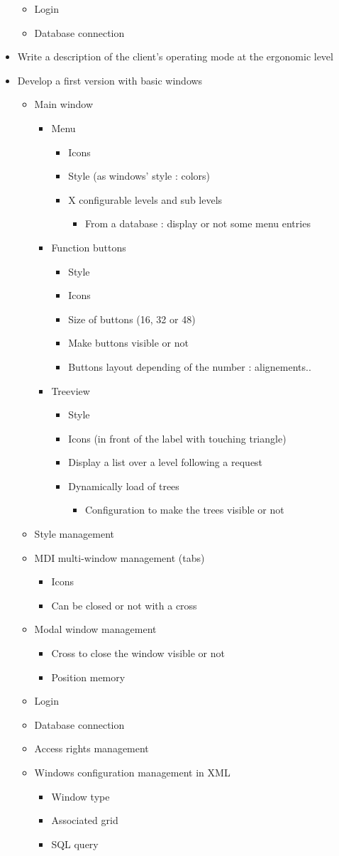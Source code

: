 \documentclass[a4paper, 12pt, french]{article}
\newcommand{\bdot}{\item[\color{ssiYellow}\ding{108}]}
\newcommand{\bdotoutlined}{\item[\color{ssiYellow}\ding{109}]}
\newcommand{\bsquare}{\item[\color{ssiYellow}\ding{110}]}
\newcommand{\bsquareoutlined}{\item[\color{ssiYellow}\ding{111}]}
\newcommand{\bdiamond}{\item[\color{ssiYellow}\ding{117}]}
\begin{document}
\begin{itemize}
\begin{itemize}
\begin{itemize}
									\end{itemize}
								\bdotoutlined{Login}
								\bdotoutlined{Database connection}
							\end{itemize}
						\bdot{Write a description of the client's operating mode at the ergonomic level}
						\bdot{Develop a first version with basic windows}
							\begin{itemize}
								\bdotoutlined{Main window}
									\begin{itemize}
										\bsquare{Menu}
											\begin{itemize}
												\bsquareoutlined{Icons}
												\bsquareoutlined{Style (as windows' style : colors)}
												\bsquareoutlined{X configurable levels and sub levels}
													\begin{itemize}
														\bdiamond{From a database : display or not some menu entries}
													\end{itemize}
											\end{itemize}
										\bsquare{Function buttons}
											\begin{itemize}
												\bsquareoutlined{Style}
												\bsquareoutlined{Icons}
												\bsquareoutlined{Size of buttons (16, 32 or 48)}
												\bsquareoutlined{Make buttons visible or not}
												\bsquareoutlined{Buttons layout depending of the number : alignements..}
											\end{itemize}
										\bsquare{Treeview}
											\begin{itemize}
												\bsquareoutlined{Style}
												\bsquareoutlined{Icons (in front of the label with touching triangle)}
												\bsquareoutlined{Display a list over a level following a request}
												\bsquareoutlined{Dynamically load of trees}
													\begin{itemize}
														\bdiamond{Configuration to make the trees visible or not}
													\end{itemize}
											\end{itemize}
									\end{itemize}
								\bdotoutlined{Style management}
								\bdotoutlined{MDI multi-window management (tabs)}
									\begin{itemize}
										\bsquare{Icons}
										\bsquare{Can be closed or not with a cross}
									\end{itemize}
								\bdotoutlined{Modal window management}
									\begin{itemize}
										\bsquare{Cross to close the window visible or not}
										\bsquare{Position memory}
									\end{itemize}
								\bdotoutlined{Login}
								\bdotoutlined{Database connection}
								\bdotoutlined{Access rights management}
								\bdotoutlined{Windows configuration management in \gls{XML}}
									\begin{itemize}
										\bsquare{Window type}
										\bsquare{Associated grid}
										\bsquare{SQL query}
									\end{itemize}
							\end{itemize}
					\end{itemize}
\end{document}
